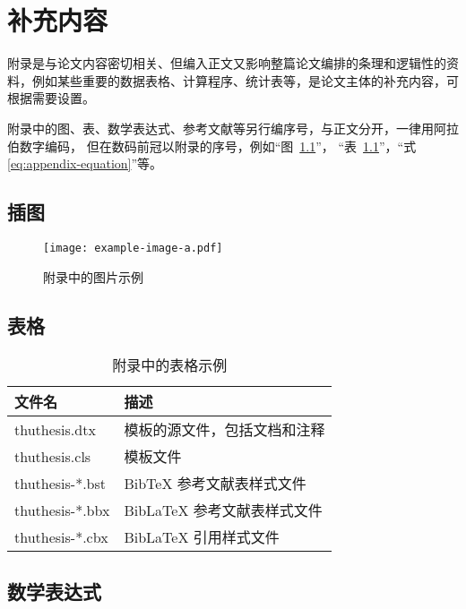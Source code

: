 
\chapter{补充内容}

附录是与论文内容密切相关、但编入正文又影响整篇论文编排的条理和逻辑性的资料，例如某些重要的数据表格、计算程序、统计表等，是论文主体的补充内容，可根据需要设置。

附录中的图、表、数学表达式、参考文献等另行编序号，与正文分开，一律用阿拉伯数字编码，
但在数码前冠以附录的序号，例如“图~\ref{fig:appendix-figure}”，
“表~\ref{tab:appendix-table}”，“式\eqref{eq:appendix-equation}”等。


\section{插图}


\begin{figure}
  \centering
  \texttt{[image: example-image-a.pdf]}
  \caption{附录中的图片示例}
  \label{fig:appendix-figure}
\end{figure}


\section{表格}


\begin{table}
  \centering
  \caption{附录中的表格示例}
  \begin{tabular}{ll}
    \toprule
    文件名             & 描述                 \\
    \midrule
    thuthesis.dtx   & 模板的源文件，包括文档和注释     \\
    thuthesis.cls   & 模板文件               \\
    thuthesis-*.bst & BibTeX 参考文献表样式文件   \\
    thuthesis-*.bbx & BibLaTeX 参考文献表样式文件 \\
    thuthesis-*.cbx & BibLaTeX 引用样式文件    \\
    \bottomrule
  \end{tabular}
  \label{tab:appendix-table}
\end{table}


\section{数学表达式}

